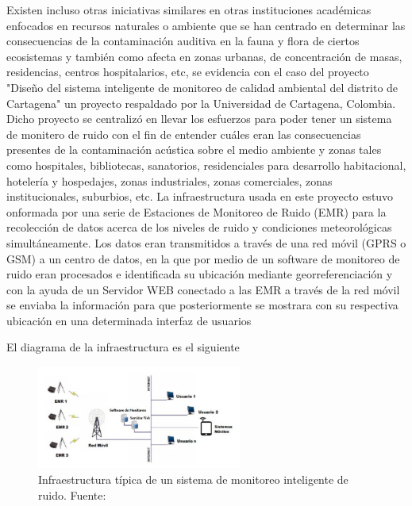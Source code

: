 {Existen incluso otras iniciativas similares en otras instituciones académicas enfocados en recursos naturales o ambiente que se han centrado en determinar las consecuencias de la contaminación auditiva en la fauna y flora de ciertos ecosistemas y también como afecta en zonas urbanas, de concentración de masas, residencias, centros hospitalarios, etc, se evidencia con el caso del proyecto "Diseño del sistema inteligente de monitoreo de calidad ambiental del distrito de Cartagena" un proyecto respaldado por la Universidad de Cartagena, Colombia. Dicho proyecto
se centralizó en llevar los esfuerzos para poder tener un sistema de monitero de ruido con el fin de entender cuáles eran las consecuencias presentes de la contaminación acústica sobre el medio ambiente y zonas tales como hospitales, bibliotecas, sanatorios, residenciales para desarrollo habitacional, hotelería y hospedajes, zonas industriales, zonas comerciales, zonas institucionales, suburbios, etc. La infraestructura usada en este proyecto estuvo onformada por
una serie de Estaciones de Monitoreo de Ruido (EMR) para la recolección de datos acerca
de los niveles de ruido y condiciones meteorológicas simultáneamente. Los datos eran transmitidos a través de una red móvil (GPRS o GSM) a un centro de
datos, en la que por medio de un software de monitoreo de ruido eran procesados e
identificada su ubicación mediante georreferenciación y con la ayuda de un Servidor WEB
conectado a las EMR a través de la red móvil se enviaba la información para que
posteriormente se mostrara con su respectiva ubicación en una determinada
interfaz de usuarios \parencite{epacartagena2015}

El diagrama de la infraestructura es el siguiente

\begin{figure}[H] %
    \centering
    \includegraphics[width=0.6\textwidth]{img/SMI_cartagena.png}
    \caption{Infraestructura típica de un sistema de monitoreo inteligente de ruido. Fuente: \parencite{epacartagena2015}}
    \label{fig:diagrama-sistema-cartagena}
\end{figure}
}{}

